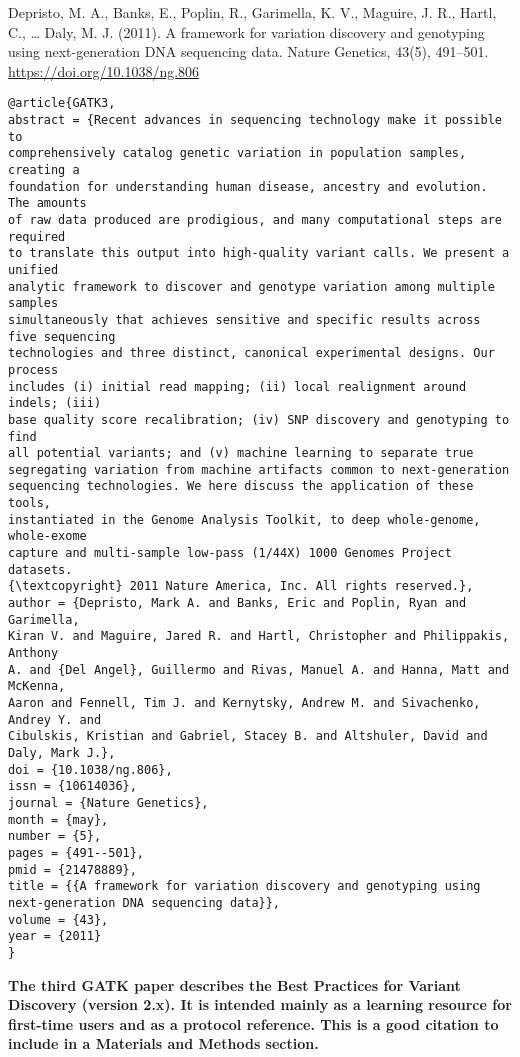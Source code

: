 \documentclass[]{article}
\begin{document}
Depristo, M. A., Banks, E., Poplin, R., Garimella, K. V., Maguire, J. R., Hartl, C., … Daly, M. J. (2011). A framework for variation discovery and genotyping using next-generation DNA sequencing data. Nature Genetics, 43(5), 491–501. \url{https://doi.org/10.1038/ng.806}

\begin{verbatim}
@article{GATK3,
abstract = {Recent advances in sequencing technology make it possible to
comprehensively catalog genetic variation in population samples, creating a
foundation for understanding human disease, ancestry and evolution. The amounts
of raw data produced are prodigious, and many computational steps are required
to translate this output into high-quality variant calls. We present a unified
analytic framework to discover and genotype variation among multiple samples
simultaneously that achieves sensitive and specific results across five sequencing
technologies and three distinct, canonical experimental designs. Our process
includes (i) initial read mapping; (ii) local realignment around indels; (iii)
base quality score recalibration; (iv) SNP discovery and genotyping to find
all potential variants; and (v) machine learning to separate true
segregating variation from machine artifacts common to next-generation
sequencing technologies. We here discuss the application of these tools,
instantiated in the Genome Analysis Toolkit, to deep whole-genome, whole-exome
capture and multi-sample low-pass (1/44X) 1000 Genomes Project datasets.
{\textcopyright} 2011 Nature America, Inc. All rights reserved.},
author = {Depristo, Mark A. and Banks, Eric and Poplin, Ryan and Garimella,
Kiran V. and Maguire, Jared R. and Hartl, Christopher and Philippakis, Anthony
A. and {Del Angel}, Guillermo and Rivas, Manuel A. and Hanna, Matt and McKenna,
Aaron and Fennell, Tim J. and Kernytsky, Andrew M. and Sivachenko, Andrey Y. and
Cibulskis, Kristian and Gabriel, Stacey B. and Altshuler, David and Daly, Mark J.},
doi = {10.1038/ng.806},
issn = {10614036},
journal = {Nature Genetics},
month = {may},
number = {5},
pages = {491--501},
pmid = {21478889},
title = {{A framework for variation discovery and genotyping using
next-generation DNA sequencing data}},
volume = {43},
year = {2011}
}
\end{verbatim}

\textbf{The third GATK paper describes the Best Practices for Variant Discovery (version 2.x). It is intended mainly as a learning resource for first-time users and as a protocol reference. This is a good citation to include in a Materials and Methods section.}
\end{document}
